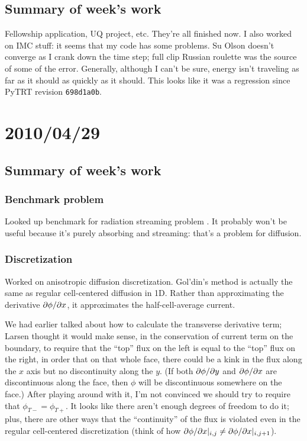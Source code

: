 \documentclass[11pt]{SRJresearch}
\newcommand{\pyrev}[1]{\textsf{PyTRT} revision \texttt{#1}}
\begin{document}
\subsection{Summary of week's work}
Fellowship application, UQ project, etc. They're all finished now. I also
worked on IMC stuff: it seems that my code has some problems. Su Olson doesn't
converge as I crank down the time step; full clip Russian roulette was the
source of some of the error. Generally, although I can't be sure, energy isn't
traveling as far as it should as quickly as it should. This looks like it was a
regression since \pyrev{698d1a0b}.

\section{2010/04/29}

\subsection{Summary of week's work}

\subsubsection{Benchmark problem}
Looked up benchmark for radiation streaming problem \cite{Ack1989}. It probably
won't be useful because it's purely absorbing and streaming: that's a problem
for diffusion.

\subsubsection{Discretization}
Worked on anisotropic diffusion discretization. Gol'din's method
\cite{Val2002} is actually the same as regular cell-centered diffusion in 1D.
Rather than approximating the derivative ${\partial \phi}/{\partial x}$, it approximates the
half-cell-average current.

We had earlier talked about how to calculate the transverse derivative term;
Larsen thought it would make sense, in the conservation of current term on the
boundary, to require that the ``top'' flux on the left is equal to the ``top''
flux on the right, in order that on that whole face, there could be a kink in
the flux along the $x$ axis but no discontinuity along the $y$. (If both
${\partial \phi}/{\partial y}$ and ${\partial \phi}/{\partial x}$ are discontinuous along the face, then
$\phi$ will be discontinuous somewhere on the face.) After playing around with
it, I'm not convinced we should try to require that $\phi_{T-} = \phi_{T+}$. It
looks like there aren't enough degrees of freedom to do it; plus, there are
other ways that the ``continuity'' of the flux is violated even in the regular
cell-centered discretization (think of how ${\partial \phi}/{\partial x}|_{i,j} \ne {\partial \phi}/{\partial x}|_{i,j+1}$).
\end{document}
